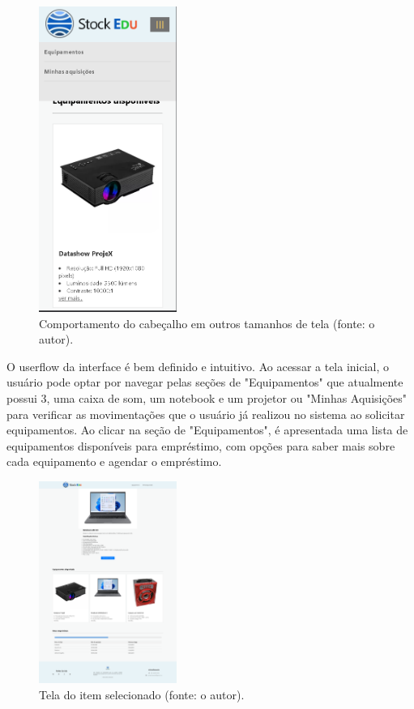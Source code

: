 \documentclass[
	12pt,				%
	openright,			%
	twoside,			%
	a4paper,			%
	english,			%
	french,				%
	spanish,			%
	brazil				%
	]{abntex2}
\begin{document}
\begin{figure}[htb]
	\centering
	\includegraphics[width=0.4\textwidth]{fig/print6-responsividademain.png}
	\caption{Comportamento do cabeçalho em outros tamanhos de tela (fonte: o autor).}
	\label{fig:print6-responsividademain}
\end{figure}

O userflow da interface é bem definido e intuitivo. Ao acessar a tela inicial,
o usuário pode optar por navegar pelas seções de "Equipamentos" que atualmente
possui 3, uma caixa de som, um notebook e um projetor ou "Minhas Aquisições"
para verificar as movimentações que o usuário já realizou no sistema ao solicitar
equipamentos. Ao clicar na seção de "Equipamentos", é apresentada uma lista de
equipamentos disponíveis para empréstimo, com opções para saber mais sobre
cada equipamento e agendar o empréstimo.

\begin{figure}[htb]
	\centering
	\includegraphics[width=0.4\textwidth]{fig/print7-telaproduto.png}
	\caption{Tela do item selecionado (fonte: o autor).}
	\label{fig:print7-telaproduto}
\end{figure}
\end{document}
